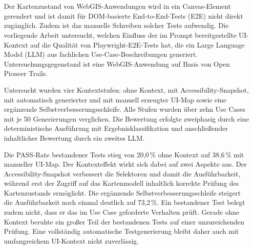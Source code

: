 \section*{%
	}

Der Kartenzustand von WebGIS-Anwendungen wird in ein Canvas-Element gerendert und ist damit für DOM-basierte End-to-End-Tests (E2E) nicht direkt zugänglich. Zudem ist das manuelle Schreiben solcher Tests aufwendig. Die vorliegende Arbeit untersucht, welchen Einfluss der im Prompt bereitgestellte UI-Kontext auf die Qualität von Playwright-E2E-Tests hat, die ein Large Language Model (LLM) aus fachlichen Use-Case-Beschreibungen generiert. Untersuchungsgegenstand ist eine WebGIS-Anwendung auf Basis von Open Pioneer Trails.

Untersucht wurden vier Kontextstufen: ohne Kontext, mit Accessibility-Snapshot, mit automatisch generierter und mit manuell erzeugter UI-Map sowie eine ergänzende Selbstverbesserungsschleife. Alle Stufen wurden über zehn Use Cases mit je 50 Generierungen verglichen. Die Bewertung erfolgte zweiphasig durch eine deterministische Ausführung mit Ergebnisklassifikation und anschließender inhaltlicher Bewertung durch ein zweites LLM.

Die PASS-Rate bestandener Tests stieg von 20,0\,\% ohne Kontext auf 38,6\,\% mit manueller UI-Map. Der Kontexteffekt wirkt sich dabei auf zwei Aspekte aus. Der Accessibility-Snapshot verbessert die Selektoren und damit die Ausführbarkeit, während erst der Zugriff auf das Kartenmodell inhaltlich korrekte Prüfung des Kartenzustands ermöglicht. Die ergänzende Selbstverbesserungsschleife steigert die Ausführbarkeit noch einmal deutlich auf 73,2\,\%. Ein bestandener Test belegt zudem nicht, dass er das im Use Case geforderte Verhalten prüft. Gerade ohne Kontext beruhte ein großer Teil der bestandenen Tests auf einer unzureichenden Prüfung. Eine vollständig automatische Testgenerierung bleibt daher auch mit umfangreichem UI-Kontext nicht zuverlässig.